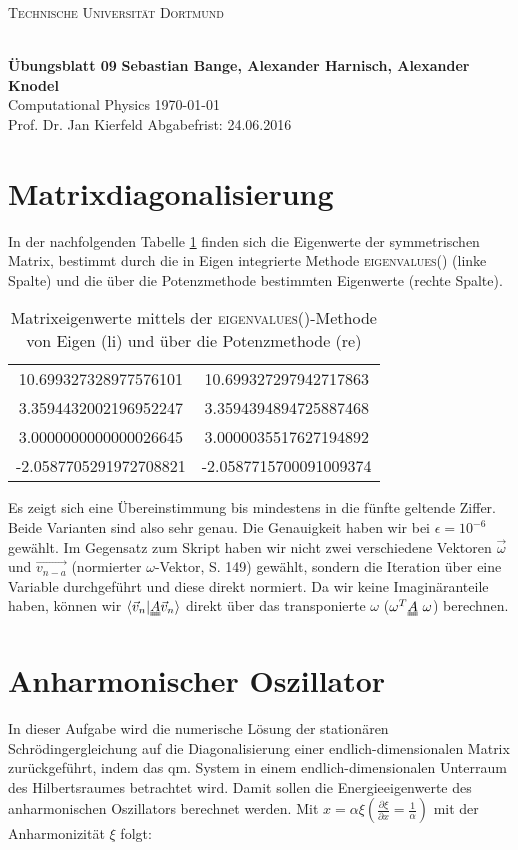 
\usepackage{verbatim}
\usepackage{ulem}
\usepackage{braket}
\newcommand\OverfullCenter[1]{\noindent\makebox[\linewidth]{#1}}

\noindent
\centerline{\small{\textsc{Technische Universität Dortmund}}} \\
\large\textbf{Übungsblatt 09} \hfill \footnotesize\textbf{Sebastian Bange, Alexander Harnisch, Alexander Knodel} \\
\normalsize Computational Physics \hfill \today \\
Prof. Dr. Jan Kierfeld \hfill Abgabefrist: 24.06.2016\\
\noindent\makebox[\linewidth]{\rule{\textwidth}{0.4pt}}
\section*{Matrixdiagonalisierung}
In der nachfolgenden Tabelle \ref{table:1aeigenvalues} finden sich die Eigenwerte der symmetrischen Matrix, bestimmt durch die in Eigen integrierte Methode \textsc{eigenvalues()} (linke Spalte) und die über die Potenzmethode bestimmten Eigenwerte (rechte Spalte).
\begin{table}[]
\centering
\caption{Matrixeigenwerte mittels der \textsc{eigenvalues()}-Methode von Eigen (li) und über die Potenzmethode (re)}
\label{table:1aeigenvalues}
\begin{tabular}{cc}
10.699327328977576101  & 10.699327297942717863   \\
3.3594432002196952247  & 3.3594394894725887468   \\
3.0000000000000026645  & 3.0000035517627194892    \\
-2.0587705291972708821 & -2.0587715700091009374 \\
\end{tabular}
\end{table}
Es zeigt sich eine Übereinstimmung bis mindestens in die fünfte geltende Ziffer. Beide Varianten sind also sehr genau. Die Genauigkeit haben wir bei $\epsilon = 10^{-6}$ gewählt. Im Gegensatz zum Skript haben wir nicht zwei verschiedene Vektoren $\vec{\omega}$ und $\vec{v_{n-a}}$ (normierter $\omega$-Vektor, S. 149) gewählt, sondern die Iteration über eine Variable durchgeführt und diese direkt normiert. Da wir keine Imaginäranteile haben, können wir $\braket{\vec{v}_n | \uuline{A}\vec{v}_n}$ direkt über das transponierte $\omega$ ($\omega^T \uuline{A}\,\,\omega$) berechnen.

\section*{Anharmonischer Oszillator}
In dieser Aufgabe wird die numerische Lösung der stationären Schrödingergleichung auf die Diagonalisierung einer endlich-dimensionalen Matrix zurückgeführt, indem das qm. System in einem endlich-dimensionalen Unterraum des Hilbertsraumes betrachtet wird. Damit sollen die Energieeigenwerte des anharmonischen Oszillators berechnet werden.
Mit $x = \alpha \xi \left( \frac{\partial \xi}{\partial x} = \frac{1}{\alpha}\right)$ mit der Anharmonizität $\xi$  folgt:

